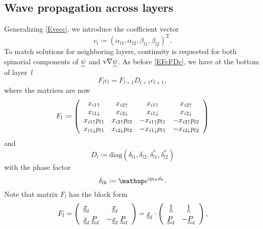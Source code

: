 \subsection{Wave propagation across layers}

Generalizing \cref{Evecc},
we introduce the coefficient vector
\begin{equation}
  c_l \coloneqq  {(\alpha_{l1}, \alpha_{l2}, \beta_{l1}, \beta_{l2})}^\text{T}.
\end{equation}
To match solutions for neighboring layers,
continuity is requested for both spinorial components
of $\underline{\psi}$ and $\text{v}{\nabla}\underline{\psi}$.
As before \cref{EFcFDc}, we have at the bottom of layer~$l$
\begin{equation}\label{EFcFDcp}
  F_l c_l = F_{l+1} D_{l+1} c_{l+1},
\end{equation}
where the matrices are now
\begin{equation}
  F_l \coloneqq  \left(\begin{array}{cccc}
    x_{i1\uparrow}      &x_{i2\uparrow}     &x_{i1\uparrow}       &x_{i2\uparrow}       \\
    x_{i1\downarrow}      &x_{i2\downarrow}     &x_{i1\downarrow}       &x_{i2\downarrow}       \\
    x_{i1\uparrow}p_{l1}&x_{i2\uparrow}p_{l2}&-x_{i1\uparrow}p_{l1}&-x_{i2\uparrow}p_{l2}\\
    x_{i1\downarrow}p_{l1}&x_{i2\downarrow}p_{l2}&-x_{i1\downarrow}p_{l1}&-x_{i2\downarrow}p_{l2}
  \end{array}\right)
\end{equation}
and
\begin{equation}
  D_l \coloneqq  \text{diag}(\delta_{l1}, \delta_{l2}, \delta_{l1}^*, \delta_{l2}^*)
\end{equation}
with the phase factor
\begin{equation}
   \delta_{l k} \coloneqq  \e^{ip_{l k}d_k}.
\end{equation}
Note that matrix $F_l$ has the block form
\begin{equation}
  F_l
  =\left(\begin{array}{ll}\underline{\underline{x}}_l&\hphantom{-}\underline{\underline{x}}_l\\[1ex]
    \underline{\underline{x}}_l\; \underline{\underline{P}}_l&-\underline{\underline{x}}_l\; \underline{\underline{P}}_l\end{array}\right)
    = \underline{\underline{x}}_l \cdot
    \left(\begin{array}{cc}\underline{\underline{1}}&\underline{\underline{1}}\\[1ex]
    \underline{\underline{P}}_l&-\underline{\underline{P}}_l\end{array}\right),
\end{equation}
